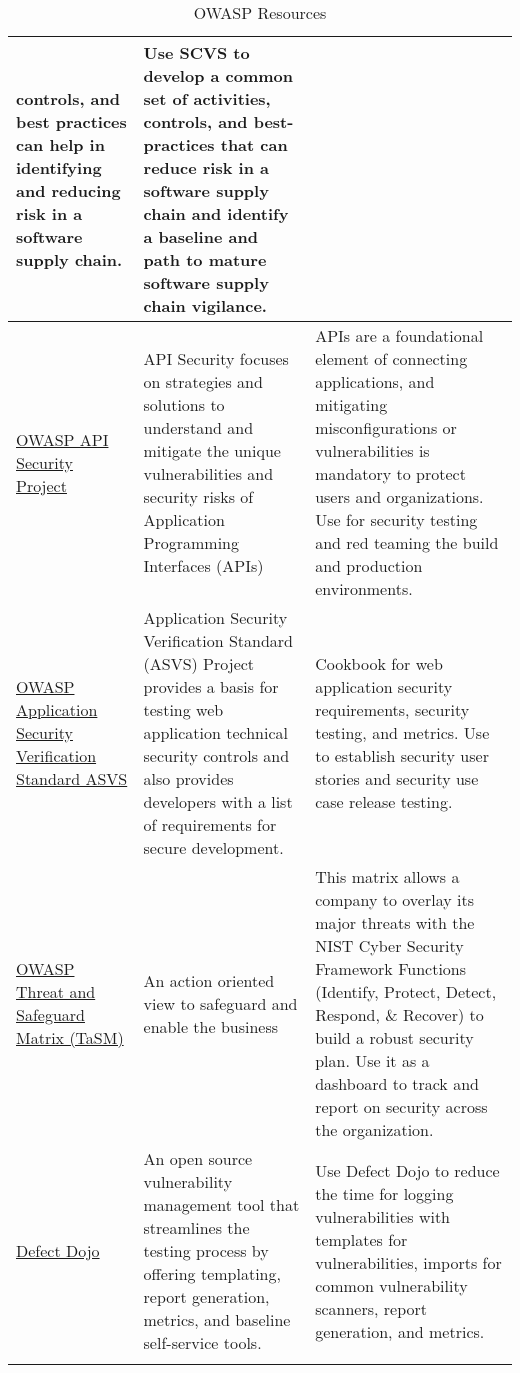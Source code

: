 \begin{longtable}[c]{|p{}|p{}|p{}|}
  controls, and best practices can help in identifying and reducing risk in a
  software supply chain. &
  Use SCVS to develop a common set of activities, controls, and best-practices
  that can reduce risk in a software supply chain and identify a baseline and
  path to mature software supply chain vigilance. \\
  \hline
  \href{https://owasp.org/www-project-api-security/}{OWASP API Security Project } &
  API Security focuses on strategies and solutions to understand and mitigate
  the unique vulnerabilities and security risks of Application Programming
  Interfaces (APIs) &
  APIs are a foundational element of connecting applications, and mitigating
  misconfigurations or vulnerabilities is mandatory to protect users and
  organizations. Use for security testing and red teaming the build and
  production environments. \\
  \hline
  \href{https://owasp.org/www-project-application-security-verification-standard/}{OWASP Application Security Verification Standard ASVS} &
  Application Security Verification Standard (ASVS) Project provides a basis
  for testing web application technical security controls and also provides
  developers with a list of requirements for secure development. &
  Cookbook for web application security requirements, security testing, and
  metrics. Use to establish security user stories and security use case release
  testing. \\
  \hline
  \href{https://owasp.org/www-project-threat-and-safeguard-matrix/}{OWASP Threat and Safeguard Matrix (TaSM)} &
  An action oriented view to safeguard and enable the business &
  This matrix allows a company to overlay its major threats with the NIST Cyber
  Security Framework Functions (Identify, Protect, Detect, Respond, \& Recover)
  to build a robust security plan. Use it as a dashboard to track and report on
  security across the organization. \\
  \hline
  \href{https://www.defectdojo.com/}{Defect Dojo} &
  An open source vulnerability management tool that streamlines the testing
  process by offering templating, report generation, metrics, and baseline
  self-service tools. &
  Use Defect Dojo to reduce the time for logging vulnerabilities with templates
  for vulnerabilities, imports for common vulnerability scanners, report
  generation, and metrics. \\
  \hline
  \caption{OWASP Resources}
  \label{tab:owasp-resources}
\end{longtable}

